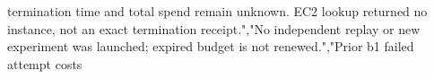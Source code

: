 \documentclass[10pt]{article}
\begin{document}
\allowbreak{}t\allowbreak{}e\allowbreak{}r\allowbreak{}m\allowbreak{}i\allowbreak{}n\allowbreak{}a\allowbreak{}t\allowbreak{}i\allowbreak{}o\allowbreak{}n\allowbreak{} \allowbreak{}t\allowbreak{}i\allowbreak{}m\allowbreak{}e\allowbreak{} \allowbreak{}a\allowbreak{}n\allowbreak{}d\allowbreak{} \allowbreak{}t\allowbreak{}o\allowbreak{}t\allowbreak{}a\allowbreak{}l\allowbreak{} \allowbreak{}s\allowbreak{}p\allowbreak{}e\allowbreak{}n\allowbreak{}d\allowbreak{} \allowbreak{}r\allowbreak{}e\allowbreak{}m\allowbreak{}a\allowbreak{}i\allowbreak{}n\allowbreak{} \allowbreak{}u\allowbreak{}n\allowbreak{}k\allowbreak{}n\allowbreak{}o\allowbreak{}w\allowbreak{}n\allowbreak{}.\allowbreak{} \allowbreak{}E\allowbreak{}C\allowbreak{}2\allowbreak{} \allowbreak{}l\allowbreak{}o\allowbreak{}o\allowbreak{}k\allowbreak{}u\allowbreak{}p\allowbreak{} \allowbreak{}r\allowbreak{}e\allowbreak{}t\allowbreak{}u\allowbreak{}r\allowbreak{}n\allowbreak{}e\allowbreak{}d\allowbreak{} \allowbreak{}n\allowbreak{}o\allowbreak{} \allowbreak{}i\allowbreak{}n\allowbreak{}s\allowbreak{}t\allowbreak{}a\allowbreak{}n\allowbreak{}c\allowbreak{}e\allowbreak{},\allowbreak{} \allowbreak{}n\allowbreak{}o\allowbreak{}t\allowbreak{} \allowbreak{}a\allowbreak{}n\allowbreak{} \allowbreak{}e\allowbreak{}x\allowbreak{}a\allowbreak{}c\allowbreak{}t\allowbreak{} \allowbreak{}t\allowbreak{}e\allowbreak{}r\allowbreak{}m\allowbreak{}i\allowbreak{}n\allowbreak{}a\allowbreak{}t\allowbreak{}i\allowbreak{}o\allowbreak{}n\allowbreak{} \allowbreak{}r\allowbreak{}e\allowbreak{}c\allowbreak{}e\allowbreak{}i\allowbreak{}p\allowbreak{}t\allowbreak{}.\allowbreak{}"\allowbreak{},\allowbreak{}"\allowbreak{}N\allowbreak{}o\allowbreak{} \allowbreak{}i\allowbreak{}n\allowbreak{}d\allowbreak{}e\allowbreak{}p\allowbreak{}e\allowbreak{}n\allowbreak{}d\allowbreak{}e\allowbreak{}n\allowbreak{}t\allowbreak{} \allowbreak{}r\allowbreak{}e\allowbreak{}p\allowbreak{}l\allowbreak{}a\allowbreak{}y\allowbreak{} \allowbreak{}o\allowbreak{}r\allowbreak{} \allowbreak{}n\allowbreak{}e\allowbreak{}w\allowbreak{} \allowbreak{}e\allowbreak{}x\allowbreak{}p\allowbreak{}e\allowbreak{}r\allowbreak{}i\allowbreak{}m\allowbreak{}e\allowbreak{}n\allowbreak{}t\allowbreak{} \allowbreak{}w\allowbreak{}a\allowbreak{}s\allowbreak{} \allowbreak{}l\allowbreak{}a\allowbreak{}u\allowbreak{}n\allowbreak{}c\allowbreak{}h\allowbreak{}e\allowbreak{}d\allowbreak{};\allowbreak{} \allowbreak{}e\allowbreak{}x\allowbreak{}p\allowbreak{}i\allowbreak{}r\allowbreak{}e\allowbreak{}d\allowbreak{} \allowbreak{}b\allowbreak{}u\allowbreak{}d\allowbreak{}g\allowbreak{}e\allowbreak{}t\allowbreak{} \allowbreak{}i\allowbreak{}s\allowbreak{} \allowbreak{}n\allowbreak{}o\allowbreak{}t\allowbreak{} \allowbreak{}r\allowbreak{}e\allowbreak{}n\allowbreak{}e\allowbreak{}w\allowbreak{}e\allowbreak{}d\allowbreak{}.\allowbreak{}"\allowbreak{},\allowbreak{}"\allowbreak{}P\allowbreak{}r\allowbreak{}i\allowbreak{}o\allowbreak{}r\allowbreak{} \allowbreak{}b\allowbreak{}1\allowbreak{} \allowbreak{}f\allowbreak{}a\allowbreak{}i\allowbreak{}l\allowbreak{}e\allowbreak{}d\allowbreak{} \allowbreak{}a\allowbreak{}t\allowbreak{}t\allowbreak{}e\allowbreak{}m\allowbreak{}p\allowbreak{}t\allowbreak{} \allowbreak{}c\allowbreak{}o\allowbreak{}s\allowbreak{}t\allowbreak{}s\allowbreak{} 
\end{document}
